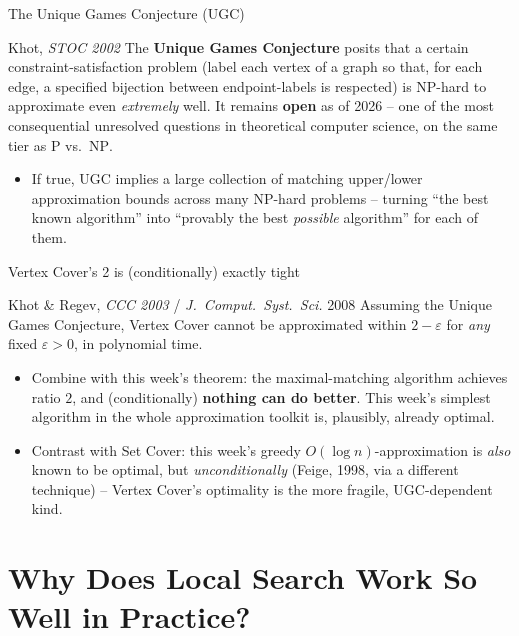 \documentclass[11pt,aspectratio=169]{beamer}
\begin{document}
\begin{frame}{The Unique Games Conjecture (UGC)}
  \begin{block}{Khot, \emph{STOC 2002}}
    The \textbf{Unique Games Conjecture} posits that a certain constraint-satisfaction
    problem (label each vertex of a graph so that, for each edge, a specified bijection
    between endpoint-labels is respected) is NP-hard to approximate even
    \emph{extremely} well. It remains \textbf{open} as of 2026 -- one of the most
    consequential unresolved questions in theoretical computer science, on the same tier
    as $\mathrm{P}$ vs.\ $\mathrm{NP}$.
  \end{block}
  \begin{itemize}
    \item If true, UGC implies a large collection of matching upper/lower approximation
    bounds across many NP-hard problems -- turning ``the best known algorithm'' into
    ``provably the best \emph{possible} algorithm'' for each of them.
  \end{itemize}
\end{frame}

\begin{frame}{Vertex Cover's 2 is (conditionally) exactly tight}
  \begin{block}{Khot \& Regev, \emph{CCC 2003} / \emph{J.\ Comput.\ Syst.\ Sci.} 2008}
    Assuming the Unique Games Conjecture, Vertex Cover cannot be approximated within
    $2-\varepsilon$ for \emph{any} fixed $\varepsilon>0$, in polynomial time.
  \end{block}
  \begin{itemize}
    \item Combine with this week's theorem: the maximal-matching algorithm achieves
    ratio $2$, and (conditionally) \textbf{nothing can do better}. This week's simplest
    algorithm in the whole approximation toolkit is, plausibly, already optimal.
    \item Contrast with Set Cover: this week's greedy $O(\log n)$-approximation is
    \emph{also} known to be optimal, but \emph{unconditionally} (Feige, 1998, via a
    different technique) -- Vertex Cover's optimality is the more fragile, UGC-dependent
    kind.
  \end{itemize}
\end{frame}

\section{Why Does Local Search Work So Well in Practice?}
\end{document}
